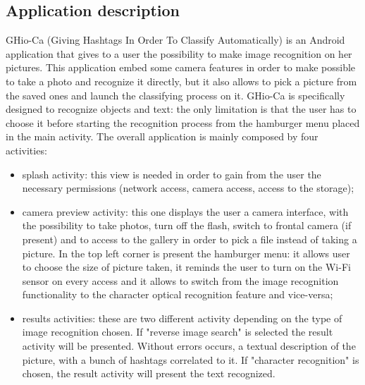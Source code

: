 \subsection{Application description}
GHio-Ca (Giving Hashtags In Order To Classify Automatically) is an Android 
application that gives to a user the possibility to make image recognition on 
her pictures. This application embed some camera features in order to make 
possible to take a photo and recognize it directly, but it also allows to pick 
a picture from the saved ones and launch the classifying process on it.
GHio-Ca is specifically designed to recognize objects and text: the only 
limitation is that the user has to choose it before starting the 
recognition process from the hamburger menu placed in the main activity. 
The overall application is mainly composed by four activities:
\begin{itemize}
  \item splash activity: this view is needed in order to gain from the user
    the necessary permissions (network access, camera access, access to 
    the storage);
  \item camera preview activity: this one displays the user a camera
    interface, with the possibility to take photos, turn off the flash, switch 
    to frontal camera (if present) and to access to the gallery in order to 
    pick a file instead of taking a picture. In the top left corner is present 
    the hamburger menu: it allows user to choose the size of picture taken, 
    it reminds the user to turn on the Wi-Fi sensor on every access and it 
    allows to switch from the image recognition functionality to the 
    character optical recognition feature and vice-versa;
  \item results activities: these are two different activity depending on 
    the type of image recognition chosen. If "reverse image search" is 
    selected the result activity will be presented. Without errors 
    occurs, a textual description of the picture, with a bunch of hashtags 
    correlated to it. If "character recognition" is chosen, the result activity 
    will present the text recognized. %
\end{itemize}
